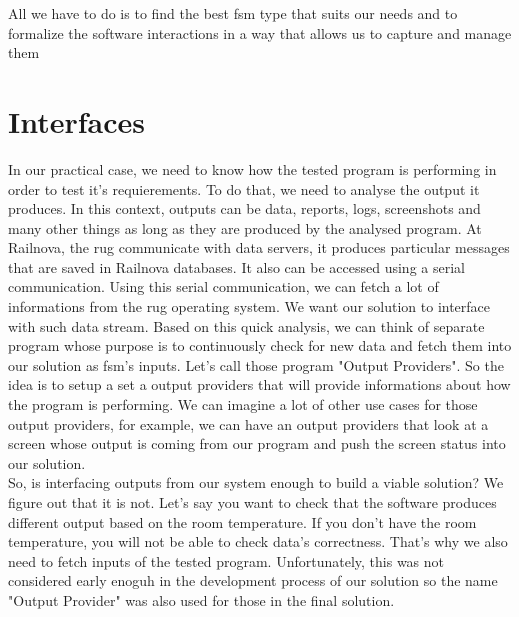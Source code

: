 \documentclass[12pt]{article}
\theoremstyle{definition}
\theoremstyle{definition}
\theoremstyle{remark}
\begin{document}
All we have to do is to find the best \gls{fsm} type that suits our needs and to formalize the software interactions in a way that allows us to capture and manage them



\section{Interfaces}


In our practical case, we need to know how the tested program is performing in order to test it's requierements. To do that, we need to analyse the output it produces. In this context, outputs can be data, reports, logs, screenshots and many other things as long as they are produced by the analysed program. At Railnova, the \gls{rug} communicate with data servers, it produces particular messages that are saved in Railnova databases. It also can be accessed using a serial communication. Using this serial communication, we can fetch a lot of informations from the \gls{rug} operating system. We want our solution to interface with such data stream. Based on this quick analysis, we can think of separate program whose purpose is to continuously check for new data and fetch them into our solution as \gls{fsm}'s inputs. Let's call those program "Output Providers". So the idea is to setup a set a output providers that will provide informations about how the program is performing. We can imagine a lot of other use cases for those output providers, for example, we can have an output providers that look at a screen whose output is coming from our program and push the screen status into our solution.\\

So, is interfacing outputs from our system enough to build a viable solution? We figure out that it is not. Let's say you want to check that the software produces different output based on the room temperature. If you don't have the room temperature, you will not be able to check data's correctness. That's why we also need to fetch inputs of the tested program. Unfortunately, this was not considered early enoguh in the development process of our solution so the name "Output Provider" was also used for those in the final solution.


\end{document}
